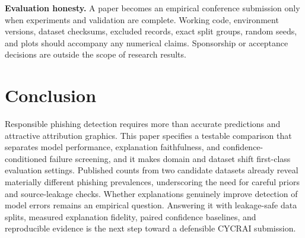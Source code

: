 \documentclass[conference,letterpaper]{IEEEtran}
\begin{document}
\textbf{Evaluation honesty.} A paper becomes an empirical conference submission only when experiments and validation are complete. Working code, environment versions, dataset checksums, excluded records, exact split groups, random seeds, and plots should accompany any numerical claims. Sponsorship or acceptance decisions are outside the scope of research results.

\section{Conclusion}
Responsible phishing detection requires more than accurate predictions and attractive attribution graphics. This paper specifies a testable comparison that separates model performance, explanation faithfulness, and confidence-conditioned failure screening, and it makes domain and dataset shift first-class evaluation settings. Published counts from two candidate datasets already reveal materially different phishing prevalences, underscoring the need for careful priors and source-leakage checks. Whether explanations genuinely improve detection of model errors remains an empirical question. Answering it with leakage-safe data splits, measured explanation fidelity, paired confidence baselines, and reproducible evidence is the next step toward a defensible CYCRAI submission.
\end{document}
